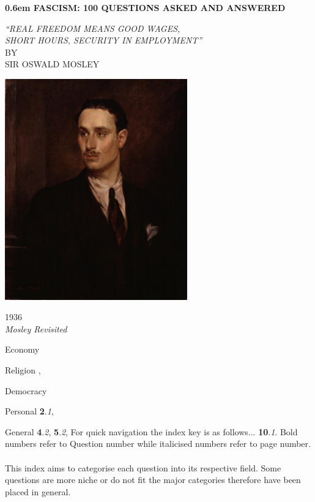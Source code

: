 \documentclass{book}
\begin{document}
\pagecolor{black}
\color{white}%
\clearpage
\newcommand\nbvspace[1][3]{\vspace*{\stretch{#1}}}
\newcommand\nbstretchyspace{\spaceskip0.5em plus 0.25em minus 0.25em}
\newcommand{\nbtitlestretch}{\spaceskip0.6em}
\begin{center}
\bfseries
\nbvspace[1]
\Huge
{\nbtitlestretch\huge
    \textbf{FASCISM}: 100 QUESTIONS ASKED AND ANSWERED}

\nbvspace[1]
\normalsize
    \textit{
``REAL FREEDOM MEANS GOOD WAGES,\\
SHORT HOURS, SECURITY IN EMPLOYMENT''\\
}
\nbvspace[1]
\small BY\\
    \Large SIR OSWALD MOSLEY\\[0.5em]

\nbvspace[2]

\includegraphics[width=3.1in]{./img/1.jpg}
\nbvspace[3]
\normalsize

1936\\
\large
    \textit{Mosley Revisited}
\nbvspace[1]
\end{center}
\newpage
{}
\pagecolor{white}
\color{black}
\begin{theindex}
 \item Economy
  \subitem
 \item Religion
  ,
 \item Democracy
 \item Personal
     \subitem \textbf{2}.\textit{1},
 \item General
     \subitem \textbf{4}.\textit{2}, \textbf{5}.\textit{2},
\indexspace
For quick navigation the index key is as follows...
    \textbf{10}.\textit{1}. Bold numbers refer to Question number
    while italicised numbers refer to page number.
\\\\
    This index aims to categorise each question into its respective field. Some questions are more niche or do not fit the major categories therefore have been placed in general.
\end{theindex}
\end{document}
